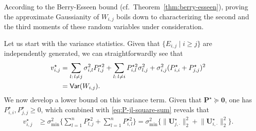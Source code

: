 According to the Berry-Esseen bound (cf.~Theorem~\ref{thm:berry-esseen}), 
proving the approximate Gaussianity of $W_{i,j}$ boils down to characterizing the second and the third moments of these random variables under consideration. 




Let us start with the variance statistics. 
Given that $\{E_{i,j}\mid i\geq j\}$ are independently generated, 
we can straightforwardly see that
%
\begin{align}
	v_{i,j}^{\star}   %
	&=\sum_{l:\,l\neq j}\sigma_{i,l}^{2}P_{l,j}^{\star 2}+\sum_{l:\,l\neq i}P_{i,l}^{\star 2}\sigma_{l,j}^{2}+\sigma_{i,j}^{2}(P_{i,i}^{\star}+P_{j,j}^{\star})^{2} \notag\\
	&= \mathsf{Var}(W_{i,j}).
	\label{eq:variance-formula-Mij}
\end{align}
%
We now develop a lower bound on this variance term.  Given
that $\bm{P}^{\star} \succeq \bm{0}$, one has $P_{i,i}^{\star},P_{j,j}^{\star}\geq0$,
which combined with \eqref{eq:P-jl-square-sum} reveals that
%
\begin{align}
v_{i,j}^{\star} & 
\geq \sigma_{\min}^{2}\Bigg\{\sum_{l=1}^{n}P_{l,j}^{\star 2}+\sum_{l=1}^{n}P_{i,l}^{\star 2}\Bigg\} 
=\sigma_{\min}^{2}\Big\{\big\|\bm{U}_{j,\cdot}^{\star}\big\|_{2}^{2}+\big\|\bm{U}_{i,\cdot}^{\star}\big\|_{2}^{2}\Big\}.
	\label{eq:vij-lower-bound-12}
\end{align}
%

